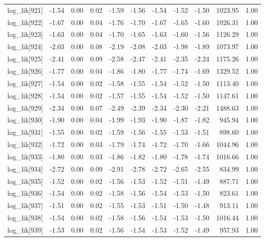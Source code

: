 \begin{table}[ht]
\begin{tabular}{rrrrrrrrrrr}
  log\_lik[921] & -1.54 & 0.00 & 0.02 & -1.59 & -1.56 & -1.54 & -1.52 & -1.50 & 1023.95 & 1.00 \\ 
  log\_lik[922] & -1.67 & 0.00 & 0.04 & -1.76 & -1.70 & -1.67 & -1.65 & -1.60 & 1026.31 & 1.00 \\ 
  log\_lik[923] & -1.63 & 0.00 & 0.04 & -1.70 & -1.65 & -1.63 & -1.60 & -1.56 & 1126.29 & 1.00 \\ 
  log\_lik[924] & -2.03 & 0.00 & 0.08 & -2.19 & -2.08 & -2.03 & -1.98 & -1.89 & 1073.97 & 1.00 \\ 
  log\_lik[925] & -2.41 & 0.00 & 0.09 & -2.58 & -2.47 & -2.41 & -2.35 & -2.24 & 1175.26 & 1.00 \\ 
  log\_lik[926] & -1.77 & 0.00 & 0.04 & -1.86 & -1.80 & -1.77 & -1.74 & -1.69 & 1329.52 & 1.00 \\ 
  log\_lik[927] & -1.54 & 0.00 & 0.02 & -1.58 & -1.55 & -1.54 & -1.52 & -1.50 & 1113.40 & 1.00 \\ 
  log\_lik[928] & -1.54 & 0.00 & 0.02 & -1.57 & -1.55 & -1.54 & -1.52 & -1.50 & 1147.61 & 1.00 \\ 
  log\_lik[929] & -2.34 & 0.00 & 0.07 & -2.49 & -2.39 & -2.34 & -2.30 & -2.21 & 1488.63 & 1.00 \\ 
  log\_lik[930] & -1.90 & 0.00 & 0.04 & -1.99 & -1.93 & -1.90 & -1.87 & -1.82 & 945.94 & 1.00 \\ 
  log\_lik[931] & -1.55 & 0.00 & 0.02 & -1.59 & -1.56 & -1.55 & -1.53 & -1.51 & 898.60 & 1.00 \\ 
  log\_lik[932] & -1.72 & 0.00 & 0.03 & -1.79 & -1.74 & -1.72 & -1.70 & -1.66 & 1044.96 & 1.00 \\ 
  log\_lik[933] & -1.80 & 0.00 & 0.03 & -1.86 & -1.82 & -1.80 & -1.78 & -1.74 & 1016.66 & 1.00 \\ 
  log\_lik[934] & -2.72 & 0.00 & 0.09 & -2.91 & -2.78 & -2.72 & -2.65 & -2.55 & 834.99 & 1.00 \\ 
  log\_lik[935] & -1.52 & 0.00 & 0.02 & -1.56 & -1.53 & -1.52 & -1.51 & -1.49 & 887.71 & 1.00 \\ 
  log\_lik[936] & -1.54 & 0.00 & 0.02 & -1.58 & -1.56 & -1.54 & -1.53 & -1.50 & 823.61 & 1.00 \\ 
  log\_lik[937] & -1.51 & 0.00 & 0.02 & -1.55 & -1.53 & -1.51 & -1.50 & -1.48 & 913.11 & 1.00 \\ 
  log\_lik[938] & -1.54 & 0.00 & 0.02 & -1.58 & -1.56 & -1.54 & -1.53 & -1.50 & 1016.44 & 1.00 \\ 
  log\_lik[939] & -1.53 & 0.00 & 0.02 & -1.56 & -1.54 & -1.53 & -1.52 & -1.49 & 957.93 & 1.00 \\ 

\end{tabular}
\end{table}
